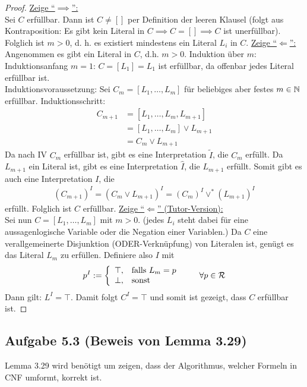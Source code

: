 \begin{proof}
	\underline{Zeige ``$\implies$'':}\\
	Sei $C$ erfüllbar. 
	Dann ist $C\neq[]$ per Definition der leeren Klausel 
	(folgt aus Kontraposition: Es gibt kein Literal in $C\implies C=[]\implies C$ ist unerfüllbar). 	
	Folglich ist $m>0$, d. h. es existiert mindestens ein Literal $L_i$ in $C$.\nl
	\underline{Zeige ``$\Longleftarrow$'':}\\
	Angenommen es gibt ein Literal in $C$, d.h. $m>0$.
	Induktion über $m$:\\
	Induktionsanfang $m=1$: $C=[L_1]=L_1$ ist erfüllbar, da offenbar jedes Literal erfüllbar ist.\\
	Induktionsvoraussetzung: Sei $C_m=[L_1,\ldots,L_m]$ für beliebiges aber festes $m\in\mathbb{N}$ erfüllbar.
	Induktionsschritt: 
	\begin{align*}
		C_{m+1}
		&=[L_1,\ldots,L_m,L_{m+1}]\\
		&=[L_1,\ldots,L_m]\vee L_{m+1}\\
		&= C_{m}\vee L_{m+1}
	\end{align*}
	Da nach IV $C_m$ erfüllbar ist, gibt es eine Interpretation $\tilde{I}$, die $C_m$ erfüllt. 
	Da $L_{m+1}$ ein Literal ist, gibt es eine Interpretation $\hat{I}$, die $L_{m+1}$ erfüllt. 
	Somit gibt es auch eine Interpretation $I$, die 
	\begin{align*}
		(C_{m+1})^I=(C_{m}\vee L_{m+1})^I=(C_{m})^I\vee^\ast (L_{m+1})^I
	\end{align*}
	erfüllt. Folglich ist $C$ erfüllbar.\nl
	\underline{Zeige ``$\Longleftarrow$'' (Tutor-Version):}\\
	Sei nun $C=[L_1,\ldots,L_m]$ mit $m>0$. 
	(jedes $L_i$ steht dabei für eine aussagenlogische Variable oder die Negation einer Variablen.)
	Da $C$ eine verallgemeinerte Disjunktion (ODER-Verknüpfung) von Literalen ist, genügt es das Literal $L_m$ zu erfüllen. 
	Definiere also $I$ mit
	\begin{align*}
		p^I:=\left\lbrace\begin{array}{cl}
			\top,&\text{falls } L_m=p\\		
			\bot,&\text{sonst }
		\end{array}\right.\qquad\forall p\in\mathcal{R}
	\end{align*}
	Dann gilt: $L^I=\top$. Damit folgt $C^I=\top$ und somit ist gezeigt, dass $C$ erfüllbar ist.
\end{proof}

\subsection{Aufgabe 5.3 (Beweis von Lemma 3.29)}
Lemma 3.29 wird benötigt um zeigen, dass der Algorithmus, welcher Formeln in CNF umformt, korrekt ist.

